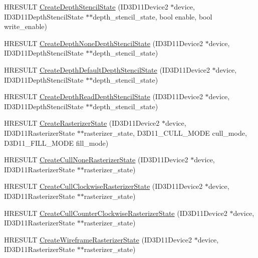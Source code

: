 \begin{DoxyCompactItemize}
\item 
H\+R\+E\+S\+U\+LT \hyperlink{namespacemage_a8821b7d9587082504cb1f4d04e53ff05}{Create\+Depth\+Stencil\+State} (I\+D3\+D11\+Device2 $\ast$device, I\+D3\+D11\+Depth\+Stencil\+State $\ast$$\ast$depth\+\_\+stencil\+\_\+state, bool enable, bool write\+\_\+enable)
\item 
H\+R\+E\+S\+U\+LT \hyperlink{namespacemage_ab1edddad5787ae095bc03f1cf5c54564}{Create\+Depth\+None\+Depth\+Stencil\+State} (I\+D3\+D11\+Device2 $\ast$device, I\+D3\+D11\+Depth\+Stencil\+State $\ast$$\ast$depth\+\_\+stencil\+\_\+state)
\item 
H\+R\+E\+S\+U\+LT \hyperlink{namespacemage_adc620b251acd7cb9c4b5f905607ceee5}{Create\+Depth\+Default\+Depth\+Stencil\+State} (I\+D3\+D11\+Device2 $\ast$device, I\+D3\+D11\+Depth\+Stencil\+State $\ast$$\ast$depth\+\_\+stencil\+\_\+state)
\item 
H\+R\+E\+S\+U\+LT \hyperlink{namespacemage_a56b331ac7866106016040e4ebce50790}{Create\+Depth\+Read\+Depth\+Stencil\+State} (I\+D3\+D11\+Device2 $\ast$device, I\+D3\+D11\+Depth\+Stencil\+State $\ast$$\ast$depth\+\_\+stencil\+\_\+state)
\item 
H\+R\+E\+S\+U\+LT \hyperlink{namespacemage_a801f8c5a484129ae6717733de626b625}{Create\+Rasterizer\+State} (I\+D3\+D11\+Device2 $\ast$device, I\+D3\+D11\+Rasterizer\+State $\ast$$\ast$rasterizer\+\_\+state, D3\+D11\+\_\+\+C\+U\+L\+L\+\_\+\+M\+O\+DE cull\+\_\+mode, D3\+D11\+\_\+\+F\+I\+L\+L\+\_\+\+M\+O\+DE fill\+\_\+mode)
\item 
H\+R\+E\+S\+U\+LT \hyperlink{namespacemage_a7583853c115c9c5cecb583fa61157c25}{Create\+Cull\+None\+Rasterizer\+State} (I\+D3\+D11\+Device2 $\ast$device, I\+D3\+D11\+Rasterizer\+State $\ast$$\ast$rasterizer\+\_\+state)
\item 
H\+R\+E\+S\+U\+LT \hyperlink{namespacemage_a033a0ae29692c9fc223e532b7487aed5}{Create\+Cull\+Clockwise\+Rasterizer\+State} (I\+D3\+D11\+Device2 $\ast$device, I\+D3\+D11\+Rasterizer\+State $\ast$$\ast$rasterizer\+\_\+state)
\item 
H\+R\+E\+S\+U\+LT \hyperlink{namespacemage_a9d5863bf2519cdac7a59c39dec10b938}{Create\+Cull\+Counter\+Clockwise\+Rasterizer\+State} (I\+D3\+D11\+Device2 $\ast$device, I\+D3\+D11\+Rasterizer\+State $\ast$$\ast$rasterizer\+\_\+state)
\item 
H\+R\+E\+S\+U\+LT \hyperlink{namespacemage_a697c6623ef997684945849dc04437a1a}{Create\+Wireframe\+Rasterizer\+State} (I\+D3\+D11\+Device2 $\ast$device, I\+D3\+D11\+Rasterizer\+State $\ast$$\ast$rasterizer\+\_\+state)
\item 
$$
\end{DoxyCompactItemize}
